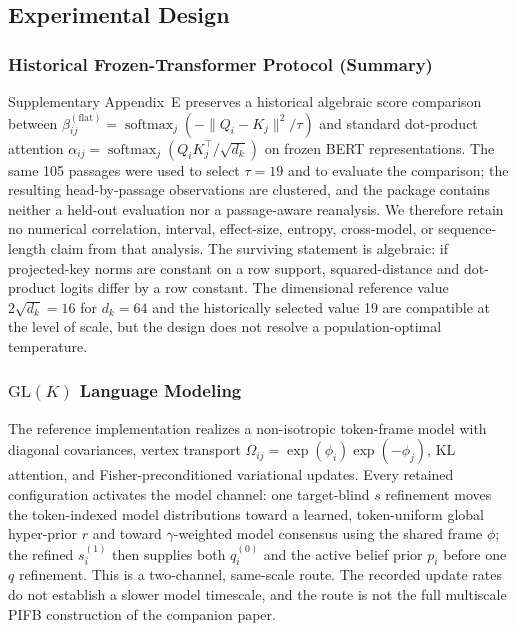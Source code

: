 \documentclass[twoside,11pt]{article}
\newcommand{\softmax}{\operatorname{softmax}}
\begin{document}
\subsection{Experimental Design}

\subsubsection{Historical Frozen-Transformer Protocol (Summary)}
\label{sec:bert_summary}
Supplementary Appendix~E preserves a historical algebraic score comparison between $\beta_{ij}^{(\mathrm{flat})}=\softmax_j(-\|Q_i-K_j\|^2/\tau)$ and standard dot-product attention $\alpha_{ij}=\softmax_j(Q_iK_j^\top/\sqrt{d_k})$ on frozen BERT representations. The same 105 passages were used to select $\tau=19$ and to evaluate the comparison; the resulting head-by-passage observations are clustered, and the package contains neither a held-out evaluation nor a passage-aware reanalysis. We therefore retain no numerical correlation, interval, effect-size, entropy, cross-model, or sequence-length claim from that analysis. The surviving statement is algebraic: if projected-key norms are constant on a row support, squared-distance and dot-product logits differ by a row constant. The dimensional reference value $2\sqrt{d_k}=16$ for $d_k=64$ and the historically selected value 19 are compatible at the level of scale, but the design does not resolve a population-optimal temperature.

\subsubsection{$\mathrm{GL}(K)$ Language Modeling}
\label{sec:experimental_design_glk}

The reference implementation realizes a non-isotropic token-frame model with diagonal covariances, vertex transport $\Omega_{ij}=\exp(\phi_i)\exp(-\phi_j)$, KL attention, and Fisher-preconditioned variational updates. Every retained configuration activates the model channel: one target-blind $s$ refinement moves the token-indexed model distributions toward a learned, token-uniform global hyper-prior $r$ and toward $\gamma$-weighted model consensus using the shared frame $\phi$; the refined $s_i^{(1)}$ then supplies both $q_i^{(0)}$ and the active belief prior $p_i$ before one $q$ refinement. This is a two-channel, same-scale route. The recorded update rates do not establish a slower model timescale, and the route is not the full multiscale PIFB construction of the companion paper.
\end{document}
